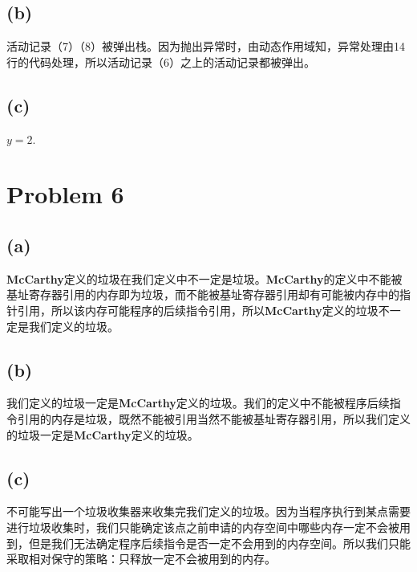 \documentclass{paper}
\begin{document}
	\subsection*{(b)}
	活动记录（7）（8）被弹出栈。因为抛出异常时，由动态作用域知，异常处理由14行的代码处理，所以活动记录（6）之上的活动记录都被弹出。
	\subsection*{(c)}
	$y = 2$.

\section*{Problem 6}
 	\subsection*{(a)}
 	\textbf{McCarthy}定义的垃圾在我们定义中不一定是垃圾。\textbf{McCarthy}的定义中不能被基址寄存器引用的内存即为垃圾，而不能被基址寄存器引用却有可能被内存中的指针引用，所以该内存可能程序的后续指令引用，所以\textbf{McCarthy}定义的垃圾不一定是我们定义的垃圾。
 	\subsection*{(b)} 
 	我们定义的垃圾一定是\textbf{McCarthy}定义的垃圾。我们的定义中不能被程序后续指令引用的内存是垃圾，既然不能被引用当然不能被基址寄存器引用，所以我们定义的垃圾一定是\textbf{McCarthy}定义的垃圾。
 	\subsection*{(c)}
 	不可能写出一个垃圾收集器来收集完我们定义的垃圾。因为当程序执行到某点需要进行垃圾收集时，我们只能确定该点之前申请的内存空间中哪些内存一定不会被用到，但是我们无法确定程序后续指令是否一定不会用到的内存空间。所以我们只能采取相对保守的策略：只释放一定不会被用到的内存。
\end{document}
